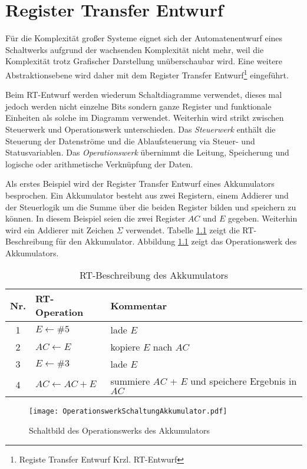 \chapter{Register Transfer Entwurf}
Für die Komplexität großer Systeme eignet sich der Automatenentwurf eines Schaltwerks aufgrund der wachsenden Komplexität nicht mehr, weil die Komplexität trotz Grafischer Darstellung unüberschaubar wird. Eine weitere Abstraktionsebene wird daher mit dem Register Transfer Entwurf\footnote{Registe Transfer Entwurf Krzl. RT-Entwurf} eingeführt.

Beim RT-Entwurf werden wiederum Schaltdiagramme verwendet, dieses mal jedoch werden nicht einzelne Bits sondern ganze Register und funktionale Einheiten als solche im Diagramm verwendet. Weiterhin wird strikt zwischen Steuerwerk und Operationswerk unterschieden. Das \emph{Steuerwerk} enthält die Steuerung der Datenströme und die Ablaufsteuerung via Steuer- und Statusvariablen. Das \emph{Operationswerk} übernimmt die Leitung, Speicherung und logische oder arithmetische Verknüpfung der Daten.

Als erstes Beispiel wird der Register Transfer Entwurf eines Akkumulators besprochen. Ein Akkumulator besteht aus zwei Registern, einem Addierer und der Steuerlogik um die Summe über die beiden Register bilden und speichern zu können. In diesem Beispiel seien die zwei Register $AC$ und $E$ gegeben. Weiterhin wird ein Addierer mit Zeichen $\Sigma$ verwendet. Tabelle \ref{rteAkku} zeigt die RT-Beschreibung für den Akkumulator. Abbildung \ref{OpSchAkku} zeigt das Operationswerk des Akkumulators.

\begin{table}[htp]
\centering
\begin{tabular}{cll}
Nr. & RT-Operation       & Kommentar \\ \hline
1   & $E \leftarrow \#5$ & lade $E$    \\
2   & $AC \leftarrow E$  & kopiere $E$ nach $AC$ \\
3   & $E \leftarrow \#3$ & lade $E$ \\
4 & $AC \leftarrow AC + E$ & summiere $AC$ + $E$ und speichere Ergebnis in $AC$ \\
\end{tabular}
\caption{RT-Beschreibung des Akkumulators}
\label{rteAkku}
\end{table}

\begin{figure}[htp]
	\centering
	\texttt{[image: OperationswerkSchaltungAkkumulator.pdf]}
	\caption{Schaltbild des Operationswerks des Akkumulators}
	\label{OpSchAkku}
\end{figure}

